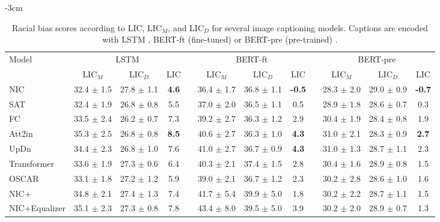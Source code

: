 \begin{table}[hbt]

\footnotesize
\centering
\addtolength{\leftskip} {-3cm}
\addtolength{\rightskip}{-3cm}

\begingroup
\setlength{\tabcolsep}{3pt} %
\renewcommand{\arraystretch}{1.2} %

\begin{tabular}{lccccccccccc}
\hline
\multirow{2}{*}{Model} & \multicolumn{3}{c}{LSTM} & & \multicolumn{3}{c}{BERT-ft} & & \multicolumn{3}{c}{BERT-pre} \\ \cline{2-4} \cline{6-8} \cline{10-12} 
                               & LIC$_M$        & LIC$_D$ & LIC & & LIC$_M$  & LIC$_D$  & LIC & & LIC$_M$  & LIC$_D$  & LIC  \\ \hline
NIC  \cite{NIC}                & 32.4 $\pm$ 1.5 & 27.8 $\pm$ 1.1 & \textbf{\color{green}4.6} & & 36.4 $\pm$ 1.7 & 36.8 $\pm$ 1.1 & \textbf{\color{green}-0.5} & & 28.3 $\pm$ 2.0 & 29.0 $\pm$ 0.9 & \textbf{\color{green}-0.7} \\
SAT \cite{SAT}                 & 32.4 $\pm$ 1.9 & 26.8 $\pm$ 0.8 & 5.5 & & 37.0 $\pm$ 2.0 & 36.5 $\pm$ 1.1 & 0.5 & & 28.9 $\pm$ 1.8 & 28.6 $\pm$ 0.7 & 0.3 \\
FC \cite{Rennie2017}           & 33.5 $\pm$ 2.4 & 26.2 $\pm$ 0.7 & 7.3 & & 39.2 $\pm$ 2.7 & 36.3 $\pm$ 1.2 & 2.9 & & 30.4 $\pm$ 1.9 & 28.4 $\pm$ 0.8 & 1.9 \\
Att2in \cite{Rennie2017}       & 35.3 $\pm$ 2.5 & 26.8 $\pm$ 0.8 & \textbf{\color{red}8.5} & & 40.6 $\pm$ 2.7 & 36.3 $\pm$ 1.0 & \textbf{\color{red}4.3} & & 31.0 $\pm$ 2.1 & 28.3 $\pm$ 0.9 & \textbf{\color{red}2.7} \\
UpDn   \cite{UpDn}             & 34.4 $\pm$ 2.3 & 26.8 $\pm$ 1.0 & 7.6 & & 41.0 $\pm$ 2.7 & 36.7 $\pm$ 0.9 & \textbf{\color{red}4.3} & & 31.0 $\pm$ 1.3 & 28.7 $\pm$ 1.1 & 2.3 \\
Transformer \cite{Transformer} & 33.6 $\pm$ 1.9 & 27.3 $\pm$ 0.6 & 6.4 & & 40.3 $\pm$ 2.1 & 37.4 $\pm$ 1.5 & 2.8 & & 30.4 $\pm$ 1.6 & 28.9 $\pm$ 0.8 & 1.5 \\
OSCAR  \cite{OSCAR}            & 33.1 $\pm$ 1.8 & 27.2 $\pm$ 1.2 & 5.9 & & 39.0 $\pm$ 2.1 & 36.7 $\pm$ 1.2 & 2.3 & & 30.2 $\pm$ 2.8 & 28.6 $\pm$ 1.0 & 1.6 \\
NIC+ \cite{Burns2018}          & 34.8 $\pm$ 2.1 & 27.4 $\pm$ 1.3 & 7.4 & & 41.7 $\pm$ 5.4 & 39.9 $\pm$ 5.0 & 1.8 & & 30.2 $\pm$ 2.2 & 28.7 $\pm$ 1.1 & 1.5 \\
NIC+Equalizer \cite{Burns2018} & 35.1 $\pm$ 2.3 & 27.3 $\pm$ 0.8 & 7.8 & & 43.4 $\pm$ 8.0 & 39.5 $\pm$ 5.0 & 3.9 & & 30.2 $\pm$ 2.0 & 28.9 $\pm$ 0.7 & 1.3 \\ \hline
\end{tabular}
\caption{Racial bias scores according to LIC, LIC$_M$, and LIC$_D$ for several image captioning models. Captions are encoded with LSTM \cite{LSTM}, BERT-ft (fine-tuned) or BERT-pre (pre-trained) \cite{BERT}.}
\label{table:race-bias}
\endgroup
\end{table}

